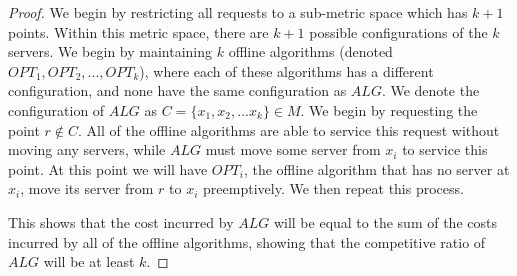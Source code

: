 \begin{proof}
    We begin by restricting all requests to a sub-metric space which has $k+1$ points. Within this metric space, there are $k+1$ possible configurations of the $k$ servers. We begin by maintaining $k$ offline algorithms (denoted $OPT_1, OPT_2, ..., OPT_k$), where each of these algorithms has a different configuration, and none have the same configuration as $ALG$. We denote the configuration of $ALG$ as $C = \{ x_1, x_2, ...x_k \} \in M$. We begin by requesting the point $r \not \in C$. All of the offline algorithms are able to service this request without moving any servers, while $ALG$ must move some server from $x_i$ to service this point. At this point we will have $OPT_i$, the offline algorithm that has no server at $x_i$, move its server from $r$ to $x_i$ preemptively. We then repeat this process.

    This shows that the cost incurred by $ALG$ will be equal to the sum of the costs incurred by all of the offline algorithms, showing that the competitive ratio of $ALG$ will be at least $k$.
\end{proof}